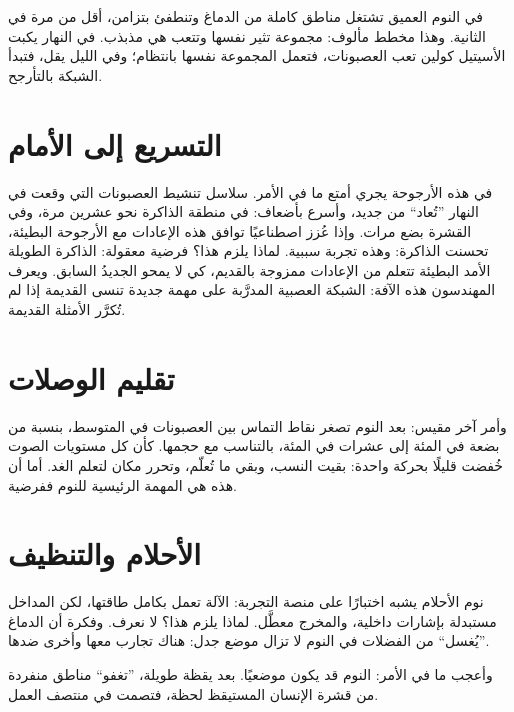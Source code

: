 في النوم العميق تشتغل مناطق كاملة من الدماغ وتنطفئ بتزامن، أقل من مرة في الثانية. وهذا مخطط مألوف: مجموعة تثير نفسها وتتعب هي مذبذب. في النهار يكبت الأسيتيل كولين تعب العصبونات، فتعمل المجموعة نفسها بانتظام؛ وفي الليل يقل، فتبدأ الشبكة بالتأرجح.


\section*{التسريع إلى الأمام}

في هذه الأرجوحة يجري أمتع ما في الأمر. سلاسل تنشيط العصبونات التي وقعت في النهار ”تُعاد“ من جديد، وأسرع بأضعاف: في منطقة الذاكرة نحو عشرين مرة، وفي القشرة بضع مرات. وإذا عُزز اصطناعيًا توافق هذه الإعادات مع الأرجوحة البطيئة، تحسنت الذاكرة: وهذه تجربة سببية. لماذا يلزم هذا؟ فرضية معقولة: الذاكرة الطويلة الأمد البطيئة تتعلم من الإعادات ممزوجة بالقديم، كي لا يمحو الجديدُ السابق. ويعرف المهندسون هذه الآفة: الشبكة العصبية المدرَّبة على مهمة جديدة تنسى القديمة إذا لم تُكرَّر الأمثلة القديمة.

\section*{تقليم الوصلات}

وأمر آخر مقيس: بعد النوم تصغر نقاط التماس بين العصبونات في المتوسط، بنسبة من بضعة في المئة إلى عشرات في المئة، بالتناسب مع حجمها. كأن كل مستويات الصوت خُفضت قليلًا بحركة واحدة: بقيت النسب، وبقي ما تُعلّم، وتحرر مكان لتعلم الغد. أما أن هذه هي المهمة الرئيسية للنوم ففرضية.

\section*{الأحلام والتنظيف}

نوم الأحلام يشبه اختبارًا على منصة التجربة: الآلة تعمل بكامل طاقتها، لكن المداخل مستبدلة بإشارات داخلية، والمخرج معطَّل. لماذا يلزم هذا؟ لا نعرف. وفكرة أن الدماغ ”يُغسل“ من الفضلات في النوم لا تزال موضع جدل: هناك تجارب معها وأخرى ضدها.

وأعجب ما في الأمر: النوم قد يكون موضعيًا. بعد يقظة طويلة، ”تغفو“ مناطق منفردة من قشرة الإنسان المستيقظ لحظة، فتصمت في منتصف العمل.

